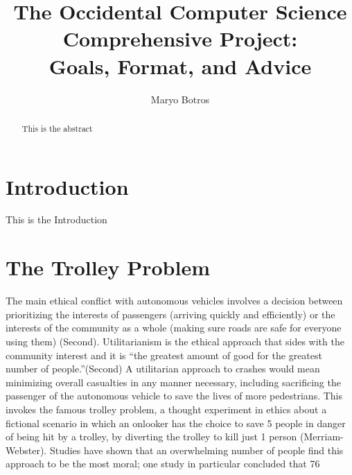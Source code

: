 \documentclass[10pt,twocolumn]{article}
\title{The Occidental Computer Science Comprehensive Project: \\ Goals, Format, and Advice}
\author{Maryo Botros}
\affiliation{Occidental College}
\begin{document}
\maketitle

\begin{abstract}
    This is the abstract
    
\end{abstract}

\section{Introduction}

This is the Introduction

\section{The Trolley Problem}
The main ethical conflict with autonomous vehicles involves a decision between prioritizing the interests of passengers (arriving quickly and efficiently) or the interests of the community as a whole (making sure roads are safe for everyone using them) (Second). Utilitarianism is the ethical approach that sides with the community interest and it is “the greatest amount of good for the greatest number of people.”(Second) A utilitarian approach to crashes would mean minimizing overall casualties in any manner necessary, including sacrificing the passenger of the autonomous vehicle to save the lives of more pedestrians. This invokes the famous trolley problem, a thought experiment in ethics about a fictional scenario in which an onlooker has the choice to save 5 people in danger of being hit by a trolley, by diverting the trolley to kill just 1 person (Merriam-Webster).  Studies have shown that an overwhelming number of people find this approach to be the most moral; one study in particular concluded that 76%
\end{document}
